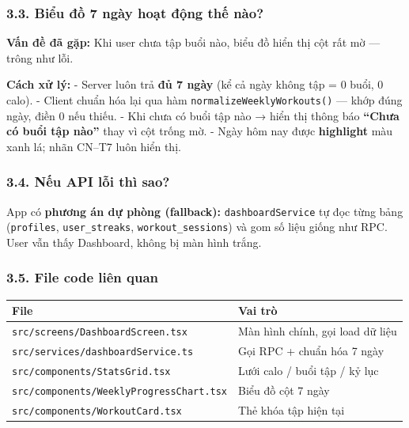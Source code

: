 \documentclass[12pt,a4paper]{article}
\begin{document}
\subsubsection{3.3. Biểu đồ 7 ngày hoạt động thế
nào?}\label{biux1ec3u-ux111ux1ed3-7-nguxe0y-houx1ea1t-ux111ux1ed9ng-thux1ebf-nuxe0o}

\textbf{Vấn đề đã gặp:} Khi user chưa tập buổi nào, biểu đồ hiển thị cột
rất mờ --- trông như lỗi.

\textbf{Cách xử lý:} - Server luôn trả \textbf{đủ 7 ngày} (kể cả ngày
không tập = 0 buổi, 0 calo). - Client chuẩn hóa lại qua hàm
\texttt{normalizeWeeklyWorkouts()} --- khớp đúng ngày, điền 0 nếu thiếu.
- Khi chưa có buổi tập nào → hiển thị thông báo \textbf{``Chưa có buổi
tập nào''} thay vì cột trống mờ. - Ngày hôm nay được \textbf{highlight}
màu xanh lá; nhãn CN--T7 luôn hiển thị.

\subsubsection{3.4. Nếu API lỗi thì
sao?}\label{nux1ebfu-api-lux1ed7i-thuxec-sao}

App có \textbf{phương án dự phòng (fallback):} \texttt{dashboardService}
tự đọc từng bảng (\texttt{profiles}, \texttt{user\_streaks},
\texttt{workout\_sessions}) và gom số liệu giống như RPC. User vẫn thấy
Dashboard, không bị màn hình trắng.

\subsubsection{3.5. File code liên quan}\label{file-code-liuxean-quan}

{\def\LTcaptype{none} %
\begin{longtable}[]{@{}ll@{}}
\toprule\noalign{}
File & Vai trò \\
\midrule\noalign{}
\endhead
\bottomrule\noalign{}
\endlastfoot
\texttt{src/screens/DashboardScreen.tsx} & Màn hình chính, gọi load dữ
liệu \\
\texttt{src/services/dashboardService.ts} & Gọi RPC + chuẩn hóa 7
ngày \\
\texttt{src/components/StatsGrid.tsx} & Lưới calo / buổi tập / kỷ lục \\
\texttt{src/components/WeeklyProgressChart.tsx} & Biểu đồ cột 7 ngày \\
\texttt{src/components/WorkoutCard.tsx} & Thẻ khóa tập hiện tại \\
\end{longtable}
}
\end{document}
